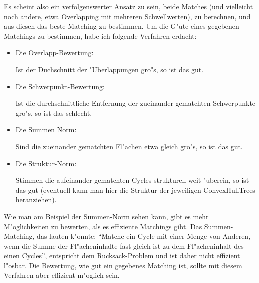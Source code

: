 \documentclass[a4paper,11pt]{scrreprt}
\begin{document}
Es scheint also ein verfolgenswerter Ansatz zu sein, beide Matches (und vielleicht noch andere, etwa Overlapping mit mehreren Schwellwerten), zu berechnen, und aus diesen das beste Matching zu bestimmen. Um die G"ute eines gegebenen Matchings zu bestimmen, habe ich folgende Verfahren erdacht:
\begin{itemize}
\item Die Overlapp-Bewertung: 

Ist der Duchschnitt der "Uberlappungen gro"s, so ist das gut.

\item Die Schwerpunkt-Bewertung:

Ist die durchschnittliche Entfernung der zueinander gematchten Schwerpunkte gro"s, so ist das schlecht.

\item Die Summen Norm:

Sind die zueinander gematchten Fl"achen etwa gleich gro"s, so ist das gut.

\item Die Struktur-Norm:

Stimmen die aufeinander gematchten Cycles strukturell weit "uberein, so ist das gut (eventuell kann man hier die Struktur der jeweiligen ConvexHullTrees heranziehen).

\end{itemize} 

Wie man am Beispiel der Summen-Norm sehen kann, gibt es mehr M"oglichkeiten zu bewerten, als es effiziente Matchings gibt. Das Summen-Matching, das lauten k"onnte: "`Matche ein Cycle mit  einer Menge von Anderen, wenn die Summe der Fl"acheninhalte fast gleich ist zu dem Fl"acheninhalt des einen Cycles"', entspricht dem Rucksack-Problem und ist daher nicht effizient l"osbar. Die Bewertung, wie gut ein gegebenes Matching ist, sollte mit diesem Verfahren aber effizient m"oglich sein.
\printindex



\end{document}
